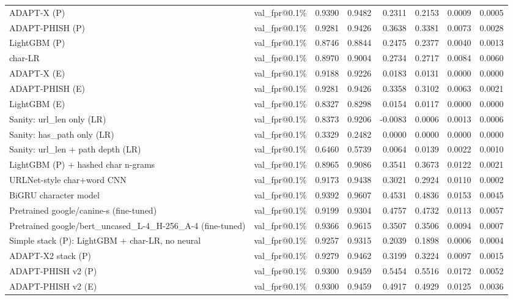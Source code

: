 \begin{table}[t]
\begin{tabular}{llrrrrrr}
ADAPT-X (P) & val\_fpr@0.1\% & 0.9390 & 0.9482 & 0.2311 & 0.2153 & 0.0009 & 0.0005 \\
ADAPT-PHISH (P) & val\_fpr@0.1\% & 0.9281 & 0.9426 & 0.3638 & 0.3381 & 0.0073 & 0.0028 \\
LightGBM (P) & val\_fpr@0.1\% & 0.8746 & 0.8844 & 0.2475 & 0.2377 & 0.0040 & 0.0013 \\
char-LR & val\_fpr@0.1\% & 0.8970 & 0.9004 & 0.2734 & 0.2717 & 0.0084 & 0.0060 \\
ADAPT-X (E) & val\_fpr@0.1\% & 0.9188 & 0.9226 & 0.0183 & 0.0131 & 0.0000 & 0.0000 \\
ADAPT-PHISH (E) & val\_fpr@0.1\% & 0.9281 & 0.9426 & 0.3358 & 0.3102 & 0.0063 & 0.0021 \\
LightGBM (E) & val\_fpr@0.1\% & 0.8327 & 0.8298 & 0.0154 & 0.0117 & 0.0000 & 0.0000 \\
Sanity: url\_len only (LR) & val\_fpr@0.1\% & 0.8373 & 0.9206 & -0.0083 & 0.0006 & 0.0013 & 0.0006 \\
Sanity: has\_path only (LR) & val\_fpr@0.1\% & 0.3329 & 0.2482 & 0.0000 & 0.0000 & 0.0000 & 0.0000 \\
Sanity: url\_len + path depth (LR) & val\_fpr@0.1\% & 0.6460 & 0.5739 & 0.0064 & 0.0139 & 0.0022 & 0.0010 \\
LightGBM (P) + hashed char n-grams & val\_fpr@0.1\% & 0.8965 & 0.9086 & 0.3541 & 0.3673 & 0.0122 & 0.0021 \\
URLNet-style char+word CNN & val\_fpr@0.1\% & 0.9173 & 0.9438 & 0.3021 & 0.2924 & 0.0110 & 0.0002 \\
BiGRU character model & val\_fpr@0.1\% & 0.9392 & 0.9607 & 0.4531 & 0.4836 & 0.0153 & 0.0045 \\
Pretrained google/canine-s (fine-tuned) & val\_fpr@0.1\% & 0.9199 & 0.9304 & 0.4757 & 0.4732 & 0.0113 & 0.0057 \\
Pretrained google/bert\_uncased\_L-4\_H-256\_A-4 (fine-tuned) & val\_fpr@0.1\% & 0.9366 & 0.9615 & 0.3507 & 0.3506 & 0.0094 & 0.0007 \\
Simple stack (P): LightGBM + char-LR, no neural & val\_fpr@0.1\% & 0.9257 & 0.9315 & 0.2039 & 0.1898 & 0.0006 & 0.0004 \\
ADAPT-X2 stack (P) & val\_fpr@0.1\% & 0.9279 & 0.9462 & 0.3199 & 0.3224 & 0.0097 & 0.0015 \\
ADAPT-PHISH v2 (P) & val\_fpr@0.1\% & 0.9300 & 0.9459 & 0.5454 & 0.5516 & 0.0172 & 0.0052 \\
ADAPT-PHISH v2 (E) & val\_fpr@0.1\% & 0.9300 & 0.9459 & 0.4917 & 0.4929 & 0.0125 & 0.0036 \\

\end{tabular}
\end{table}
